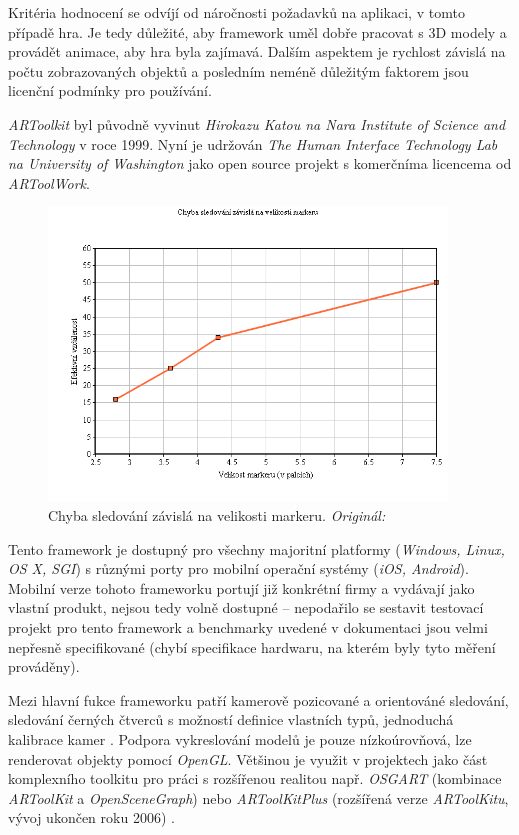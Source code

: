 \documentclass[twoside,12pt]{article}
\begin{document}
% 
\newpage 


Kritéria hodnocení se odvíjí od náročnosti požadavků na aplikaci, v tomto případě hra. Je tedy důležité, aby framework uměl dobře pracovat s 3D modely a provádět animace, aby hra byla zajímavá. Dalším aspektem je rychlost závislá na počtu zobrazovaných objektů a posledním neméně důležitým faktorem jsou licenční podmínky pro používání.


\textit{ARToolkit} byl původně vyvinut \textit{Hirokazu Katou na Nara Institute of Science and Technology} v roce 1999. Nyní je udržován \textit{The Human Interface Technology Lab na University of Washington} jako open source projekt s komerčníma licencema od \textit{ARToolWork}.

\begin{figure}[H]
    \includegraphics[width=400px, center]{images/artoolkit_benchmark.png}
    \caption[]{Chyba sledování závislá na velikosti markeru. \textit{Originál: \cite{artoolkit_benchmark}}}
    \label{artoolkit_benchmark}
\end{figure}
 Tento framework je dostupný pro všechny majoritní platformy (\textit{Windows, Linux, OS X, SGI}) s různými porty pro mobilní operační systémy (\textit{iOS, Android}). Mobilní verze tohoto frameworku portují již konkrétní firmy a vydávají jako vlastní produkt, nejsou tedy volně dostupné -- nepodařilo se sestavit testovací projekt pro tento framework a benchmarky uvedené v dokumentaci jsou velmi nepřesně specifikované (chybí specifikace hardwaru, na kterém byly tyto měření prováděny). 

Mezi hlavní fukce frameworku patří kamerově pozicované a orientováné sledování, sledování černých čtverců s možností definice vlastních typů, jednoduchá kalibrace kamer \cite{artoolkit_features}. Podpora vykreslování modelů je pouze nízkoúrovňová, lze renderovat objekty pomocí \textit{OpenGL}. Většinou je využit v projektech jako část komplexního toolkitu pro práci s rozšířenou realitou např. \textit{OSGART} (kombinace \textit{ARToolKit} a \textit{OpenSceneGraph}) \cite{osgart} nebo \textit{ARToolKitPlus} (rozšířená verze \textit{ARToolKitu}, vývoj ukončen roku 2006) \cite{wagner_schmalstieg}. 
\end{document}
